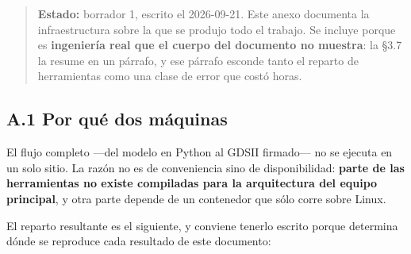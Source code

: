 \begin{quote}
\textbf{Estado:} borrador 1, escrito el 2026-09-21. Este anexo documenta
la infraestructura sobre la que se produjo todo el trabajo. Se incluye
porque es \textbf{ingeniería real que el cuerpo del documento no
muestra}: la §3.7 la resume en un párrafo, y ese párrafo esconde tanto
el reparto de herramientas como una clase de error que costó horas.
\end{quote}

\subsection{A.1 Por qué dos
máquinas}\label{a.1-por-quuxe9-dos-muxe1quinas}

El flujo completo ---del modelo en Python al GDSII firmado--- no se
ejecuta en un solo sitio. La razón no es de conveniencia sino de
disponibilidad: \textbf{parte de las herramientas no existe compiladas
para la arquitectura del equipo principal}, y otra parte depende de un
contenedor que sólo corre sobre Linux.

El reparto resultante es el siguiente, y conviene tenerlo escrito porque
determina dónde se reproduce cada resultado de este documento:

